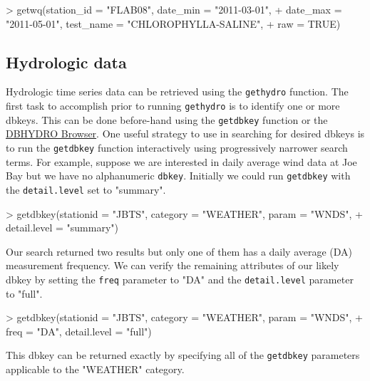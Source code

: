 \documentclass[12pt,notitlepage]{article}
\begin{document}
\begin{Schunk}
\begin{Sinput}
> getwq(station_id = "FLAB08", date_min = "2011-03-01", 
+       date_max = "2011-05-01", test_name = "CHLOROPHYLLA-SALINE",
+       raw = TRUE)
\end{Sinput}
\end{Schunk}

\subsection{Hydrologic data}

Hydrologic time series data can be retrieved using the \texttt{gethydro} function. The first task to accomplish prior to running \texttt{gethydro} is to identify one or more dbkeys. This can be done before-hand using the \texttt{getdbkey} function or the \href{http://my.sfwmd.gov/dbhydroplsql/show_dbkey_info.main_menu}{DBHYDRO Browser}. One useful strategy to use in searching for desired dbkeys is to run the \texttt{getdbkey} function interactively using progressively narrower search terms. For example, suppose we are interested in daily average wind data at Joe Bay but we have no alphanumeric \texttt{dbkey}. Initially we could run \texttt{getdbkey} with the \texttt{detail.level} set to "summary".

\begin{Schunk}
\begin{Sinput}
> getdbkey(stationid = "JBTS", category = "WEATHER", param = "WNDS",
+          detail.level = "summary")
\end{Sinput}
\end{Schunk}

\noindent Our search returned two results but only one of them has a daily average (DA) measurement frequency. We can verify the remaining attributes of our likely dbkey by setting the \texttt{freq} parameter to "DA" and the \texttt{detail.level} parameter to "full".

\begin{Schunk}
\begin{Sinput}
> getdbkey(stationid = "JBTS", category = "WEATHER", param = "WNDS",
+          freq = "DA", detail.level = "full")
\end{Sinput}
\end{Schunk}

\noindent This dbkey can be returned exactly by specifying all of the \texttt{getdbkey} parameters applicable to the "WEATHER" category.
\end{document}
